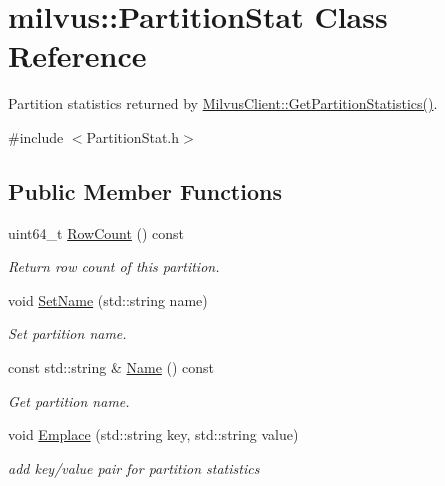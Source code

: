 \hypertarget{classmilvus_1_1_partition_stat}{}\section{milvus\+:\+:Partition\+Stat Class Reference}
\label{classmilvus_1_1_partition_stat}


Partition statistics returned by \hyperlink{classmilvus_1_1_milvus_client_a91ad7ca6b18c8c1eafd10ea0d6af1c61}{Milvus\+Client\+::\+Get\+Partition\+Statistics()}.  




{\ttfamily \#include $<$Partition\+Stat.\+h$>$}

\subsection*{Public Member Functions}
\begin{DoxyCompactItemize}
\item 
uint64\+\_\+t \hyperlink{classmilvus_1_1_partition_stat_a67137365a97dd5a4d62a993a9aa6b86e}{Row\+Count} () const
\begin{DoxyCompactList}\small\item\em Return row count of this partition. \end{DoxyCompactList}\item 
\mbox{\label{classmilvus_1_1_partition_stat_a8e94b1437fafa471b9506e32439586e5}} 
void \hyperlink{classmilvus_1_1_partition_stat_a8e94b1437fafa471b9506e32439586e5}{Set\+Name} (std\+::string name)
\begin{DoxyCompactList}\small\item\em Set partition name. \end{DoxyCompactList}\item 
\mbox{\label{classmilvus_1_1_partition_stat_a86a0d0888c605f889d257d11ab2ed976}} 
const std\+::string \& \hyperlink{classmilvus_1_1_partition_stat_a86a0d0888c605f889d257d11ab2ed976}{Name} () const
\begin{DoxyCompactList}\small\item\em Get partition name. \end{DoxyCompactList}\item 
\mbox{\label{classmilvus_1_1_partition_stat_ae9e56c1103903e353ee9f59e6e5d64fc}} 
void \hyperlink{classmilvus_1_1_partition_stat_ae9e56c1103903e353ee9f59e6e5d64fc}{Emplace} (std\+::string key, std\+::string value)
\begin{DoxyCompactList}\small\item\em add key/value pair for partition statistics \end{DoxyCompactList}\end{DoxyCompactItemize}


